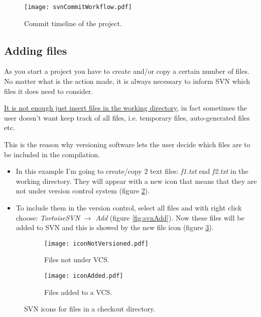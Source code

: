 \begin{figure}[htbp]
    \centering
    \texttt{[image: svnCommitWorkflow.pdf]}
    \caption{Commit timeline of the project.}
    \label{fig:svnCommitWorkflow}
\end{figure}

\subsection{Adding files}
\label{subsection:AddingFiles}

As you start a project you have to create and/or copy a certain number of files. No matter what is the action made, it is always necessary to inform SVN which files it does need to consider.

\underline{It is not enough just insert files in the working directory}, in fact sometimes the user doesn't want keep track of all files, i.e. temporary files, auto-generated files etc.

This is the reason why versioning software lets the user decide which files are to be included in the compilation.

\begin{itemize}
    \item In this example I'm going to create/copy 2 text files: \textit{f1.txt} end \textit{f2.txt} in the working directory. They will appear with a new icon that means that they are not under version control system (figure \ref{fig:iconNotVersioned}).
    
    \item To include them in the version control, select all files and with right click choose:
    \textit{TortoiseSVN} $\rightarrow$ \textit{Add} (figure \ref{fig:svnAdd}). Now these files will be added to SVN and this is showed by the new file icon (figure \ref{fig:iconAdded}).
\end{itemize}


\begin{figure}[htbp]
\begin{subfigure}{0.5\textwidth}
  \centering
  \texttt{[image: iconNotVersioned.pdf]}
  \caption{Files not under VCS.}
  \label{fig:iconNotVersioned}
\end{subfigure}%
\begin{subfigure}{0.5\textwidth}
  \centering
  \texttt{[image: iconAdded.pdf]}
  \caption{Files added to a VCS.}
  \label{fig:iconAdded}
\end{subfigure}
\caption{SVN icons for files in a checkout directory.}
\label{fig:systemIcons_2}
\end{figure}


